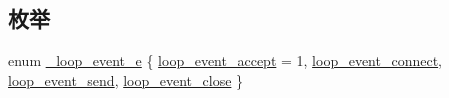 \subsection*{枚举}
\begin{DoxyCompactItemize}
\item 
enum \hyperlink{a00068_a19ff97cc6f736cb864d4e4b6ca60989d_a19ff97cc6f736cb864d4e4b6ca60989d}{\+\_\+loop\+\_\+event\+\_\+e} \{ \hyperlink{a00068_a19ff97cc6f736cb864d4e4b6ca60989d_a19ff97cc6f736cb864d4e4b6ca60989da93a9ab540948567abea69a6e0b11dc34}{loop\+\_\+event\+\_\+accept} = 1, 
\hyperlink{a00068_a19ff97cc6f736cb864d4e4b6ca60989d_a19ff97cc6f736cb864d4e4b6ca60989da4cf27e9f5908451036a97a5efaf2b9d5}{loop\+\_\+event\+\_\+connect}, 
\hyperlink{a00068_a19ff97cc6f736cb864d4e4b6ca60989d_a19ff97cc6f736cb864d4e4b6ca60989da77ae92c7311b87c9e301782962e8d0bf}{loop\+\_\+event\+\_\+send}, 
\hyperlink{a00068_a19ff97cc6f736cb864d4e4b6ca60989d_a19ff97cc6f736cb864d4e4b6ca60989da93d334afa1678d196564d70b138c7150}{loop\+\_\+event\+\_\+close}
 \}
\end{DoxyCompactItemize}
